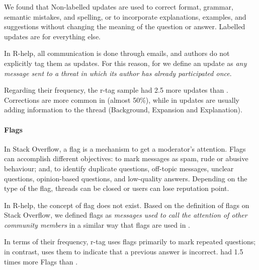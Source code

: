 We found that Non-labelled updates are used to correct format, grammar, semantic mistakes, and spelling, or to incorporate
explanations, examples, and suggestions without changing the meaning of the question or answer. Labelled updates are for everything else.

In R-help, all communication is done through emails, and authors do not explicitly tag them as updates. For this reason, for \RH we define an update as
\emph{any message sent to a threat in which its author has already participated once}.

Regarding their frequency, the \SO r-tag sample had 2.5 more updates than \RH.  Corrections are more common in \SO (almost 50\%), while in \RH updates are usually adding 
information to the thread (Background, Expansion and Explanation).

\paragraph*{Flags}

In Stack Overflow, a flag is a mechanism to get a moderator's attention.  Flags can accomplish
different objectives: to mark messages as spam, rude or abusive behaviour; and, to identify
duplicate questions, off-topic messages, unclear questions, opinion-based questions, and low-quality
answers.  Depending on the type of the flag, threads can be closed or users can lose reputation
point.  

In R-help, the concept of flag does not exist.  Based on the definition of
flags on Stack Overflow, we defined flags as \emph{messages used to call the attention of other
  community members} in a similar way that flags are used in \SO.



In terms of their frequency, \SO r-tag uses flags primarily to mark repeated questions; in contrast, \RH uses them to indicate that a previous answer is incorrect. \SO had 1.5 times more Flags than \RH.

